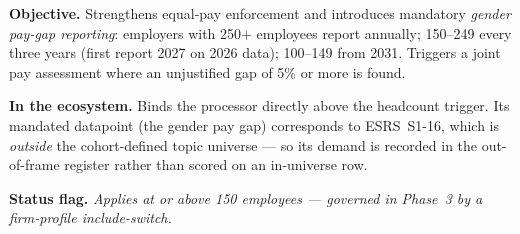 \textbf{Objective.} Strengthens equal-pay enforcement and introduces mandatory \emph{gender pay-gap reporting}: employers with 250+ employees report annually; 150--249 every three years (first report 2027 on 2026 data); 100--149 from 2031. Triggers a joint pay assessment where an unjustified gap of 5\% or more is found.

\textbf{In the ecosystem.} Binds the processor directly above the headcount trigger. Its mandated datapoint (the gender pay gap) corresponds to ESRS~S1-16, which is \emph{outside} the cohort-defined topic universe --- so its demand is recorded in the out-of-frame register rather than scored on an in-universe row.

\textbf{Status flag.} \emph{Applies at or above 150 employees --- governed in Phase~3 by a firm-profile include-switch.}
